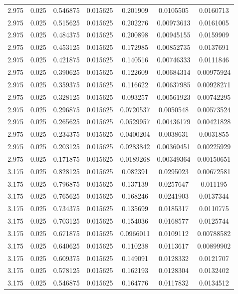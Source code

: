 \begin{flushleft}
\begin{longtable}{ccccccc}
2.975 & 0.025 & 0.546875 & 0.015625 & 0.201909 & 0.0105505 & 0.0160713  \\ 
2.975 & 0.025 & 0.515625 & 0.015625 & 0.202276 & 0.00973613 & 0.0161005  \\ 
2.975 & 0.025 & 0.484375 & 0.015625 & 0.200898 & 0.00945155 & 0.0159909  \\ 
2.975 & 0.025 & 0.453125 & 0.015625 & 0.172985 & 0.00852735 & 0.0137691  \\ 
2.975 & 0.025 & 0.421875 & 0.015625 & 0.140516 & 0.00746333 & 0.0111846  \\ 
2.975 & 0.025 & 0.390625 & 0.015625 & 0.122609 & 0.00684314 & 0.00975924  \\ 
2.975 & 0.025 & 0.359375 & 0.015625 & 0.116622 & 0.00637985 & 0.00928271  \\ 
2.975 & 0.025 & 0.328125 & 0.015625 & 0.093257 & 0.00561923 & 0.00742295  \\ 
2.975 & 0.025 & 0.296875 & 0.015625 & 0.0720537 & 0.0050548 & 0.00573524  \\ 
2.975 & 0.025 & 0.265625 & 0.015625 & 0.0529957 & 0.00436179 & 0.00421828  \\ 
2.975 & 0.025 & 0.234375 & 0.015625 & 0.0400204 & 0.0038631 & 0.0031855  \\ 
2.975 & 0.025 & 0.203125 & 0.015625 & 0.0283842 & 0.00360451 & 0.00225929  \\ 
2.975 & 0.025 & 0.171875 & 0.015625 & 0.0189268 & 0.00349364 & 0.00150651  \\ 
3.175 & 0.025 & 0.828125 & 0.015625 & 0.082391 & 0.0295023 & 0.00672581  \\ 
3.175 & 0.025 & 0.796875 & 0.015625 & 0.137139 & 0.0257647 & 0.011195  \\ 
3.175 & 0.025 & 0.765625 & 0.015625 & 0.168246 & 0.0241903 & 0.0137344  \\ 
3.175 & 0.025 & 0.734375 & 0.015625 & 0.135699 & 0.0185317 & 0.0110775  \\ 
3.175 & 0.025 & 0.703125 & 0.015625 & 0.154036 & 0.0168577 & 0.0125744  \\ 
3.175 & 0.025 & 0.671875 & 0.015625 & 0.0966011 & 0.0109112 & 0.00788582  \\ 
3.175 & 0.025 & 0.640625 & 0.015625 & 0.110238 & 0.0113617 & 0.00899902  \\ 
3.175 & 0.025 & 0.609375 & 0.015625 & 0.149091 & 0.0128332 & 0.0121707  \\ 
3.175 & 0.025 & 0.578125 & 0.015625 & 0.162193 & 0.0128304 & 0.0132402  \\ 
3.175 & 0.025 & 0.546875 & 0.015625 & 0.164776 & 0.0117832 & 0.0134512  \\ 

\end{longtable}
\end{flushleft}
